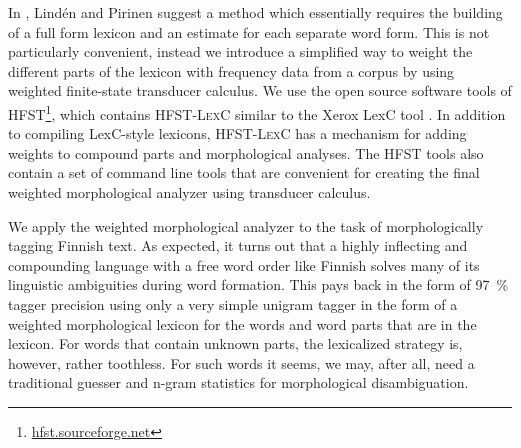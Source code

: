 \documentclass[a4paper]{article}
\begin{document}

In \cite{linden09nodalida}, Lindén and Pirinen suggest a method which
essentially requires the building of a full form lexicon and an
estimate for each separate word form. This is not particularly
convenient, instead we introduce a simplified way to weight the
different parts of the lexicon with frequency data from a corpus by
using weighted finite-state transducer calculus. We use the open
source software tools of
\textsc{HFST}\footnote{\url{hfst.sourceforge.net}}, which contains
\textsc{HFST-LexC} similar to the Xerox LexC tool
\cite{beesley2004}. In addition to compiling LexC-style lexicons,
\textsc{HFST-LexC} has a mechanism for adding weights to compound
parts and morphological analyses. The \textsc{HFST} tools also contain
a set of command line tools that are convenient for creating the final
weighted morphological analyzer using transducer calculus.

We apply the weighted morphological analyzer to the task of
morphologically tagging Finnish text. As expected, it turns out that a
highly inflecting and compounding language with a free word order like
Finnish solves many of its linguistic ambiguities during word
formation. This pays back in the form of 97~\% tagger precision using
only a very simple unigram tagger in the form of a weighted
morphological lexicon for the words and word parts that are in the
lexicon. For words that contain unknown parts, the lexicalized
strategy is, however, rather toothless. For such words it seems, we
may, after all, need a traditional guesser and n-gram statistics for
morphological disambiguation.
\end{document}

